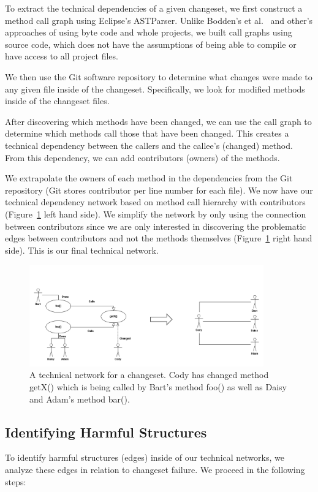 \documentclass[conference]{IEEEtran}
\begin{document}
To extract the technical dependencies of a given changeset, we first construct a method
call graph using Eclipse's ASTParser. 
Unlike  Bodden's et al.~\cite{Bodden:2003:HVJ} and other's approaches of using byte code
and whole projects, we built call graphs using source code, which does not have the assumptions
of being able to compile or have access to all project files.

We then use the Git software repository to determine what changes were made to any given
file inside of the changeset. Specifically, we look for modified methods inside of the changeset
files.

After discovering which methods have been changed, we can use the call graph to determine
which methods call those that have been changed. This creates a technical dependency between
the callers and the callee’s (changed) method. From this dependency, we can add contributors (owners) 
of the methods.

We extrapolate the owners of each method in the dependencies from the Git repository 
(Git stores contributor per line number for each file).  We now have our technical dependency 
network based on method call hierarchy with contributors (Figure~\ref{fig:network} left hand side).
We simplify the network by only using the connection between contributors since we 
are only interested in discovering the problematic edges between contributors and not the 
methods themselves (Figure~\ref{fig:network} right hand side). This is our final technical 
network.

\begin{figure}[tb!]
\centering
\includegraphics[width=0.9\textwidth, scale=0.5]{images/TecNetwork}
\caption{A technical network for a changeset. Cody has changed method getX() which is being
called by Bart's method foo() as well as Daisy and Adam's method bar().\label{fig:network}}
\end{figure}

\subsection{Identifying Harmful Structures}
To identify harmful structures (edges) inside of our technical networks, we analyze these 
edges in relation to changeset failure. We proceed in the following steps:
\end{document}
